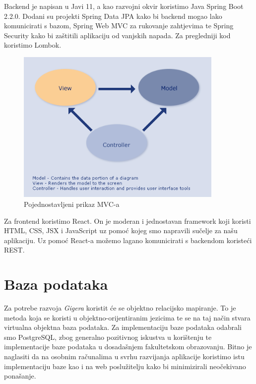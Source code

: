 	Backend je napisan u Javi 11, a kao razvojni okvir koristimo Java Spring Boot 2.2.0. Dodani su projekti Spring Data JPA kako bi backend mogao lako komunicirati s bazom, Spring Web MVC za rukovanje zahtjevima te Spring Security kako bi zaštitili aplikaciju od vanjskih napada. Za pregledniji kod koristimo Lombok.\\

	\begin{figure}[H]
		\begin{center}
			\includegraphics[width=10cm]{slike/mvc.PNG}
		\end{center}
		\caption{Pojednostavljeni prikaz MVC-a}
		\label{fig:mvc}
	\end{figure}

	Za frontend koristimo React. On je moderan i jednostavan framework koji koristi HTML, CSS, JSX i JavaScript uz pomoć kojeg smo napravili sučelje za našu aplikaciju. Uz pomoć React-a možemo lagano komunicirati s backendom koristeći REST.\\




		\section{Baza podataka}
		
		Za potrebe razvoja \textit{Gigera} koristit će se objektno relacijsko mapiranje. To je metoda koja se koristi u objektno-orijentiranim jezicima te se na taj način stvara virtualna objektna baza podataka. Za implementaciju baze podataka odabrali smo PostgreSQL, zbog generalno pozitivnog iskustva u korištenju te implementacije baze podataka u dosadašnjem fakultetskom obrazovanju. Bitno je naglasiti da na osobnim računalima u svrhu razvijanja aplikacije koristimo istu implementaciju baze kao i na web poslužitelju kako bi minimizirali neočekivano ponašanje.
		
